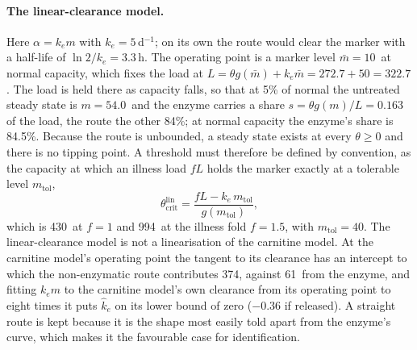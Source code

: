 \paragraph{The linear-clearance model.} Here $\alpha=k_e m$ with $k_e=5$\,d$^{-1}$; on its
own the route would clear the marker with a half-life of $\ln2/k_e=3.3$\,h. The operating
point is a marker level $\bar m=10$\uM\ at normal capacity, which fixes the load at
$L=\theta g(\bar m)+k_e\bar m=272.7+50=322.7$\um. The load is held there as capacity falls,
so that at 5\% of normal the untreated steady state is $m=54.0$\uM\ and the enzyme carries a
share $s=\theta g(m)/L=0.163$ of the load, the route the other 84\%; at normal capacity the
enzyme's share is 84.5\%. Because the route is unbounded, a steady state exists at every
$\theta\ge0$ and there is no tipping point. A threshold must therefore be defined by
convention, as the capacity at which an illness load $fL$ holds the marker exactly at a
tolerable level $m_{\mathrm{tol}}$,
\begin{equation}
\label{seq:s1-thcritlin}
\theta_{\mathrm{crit}}^{\mathrm{lin}}=\frac{fL-k_e\,m_{\mathrm{tol}}}{g(m_{\mathrm{tol}})},
\end{equation}
which is 430\um\ at $f=1$ and 994\um\ at the illness fold $f=1.5$, with
$m_{\mathrm{tol}}=40$\uM. The linear-clearance model is not a linearisation of the carnitine
model. At the carnitine model's operating point the tangent to its clearance has an
intercept to which the non-enzymatic route contributes 374\um, against 61\um\ from the
enzyme, and
fitting $k_e m$ to the carnitine model's own clearance from its operating point to eight
times it puts $\hat k_e$ on its lower bound of zero ($-0.36$ if released). A straight route
is kept because it is the shape most easily told apart from the enzyme's curve, which makes
it the favourable case for identification.

